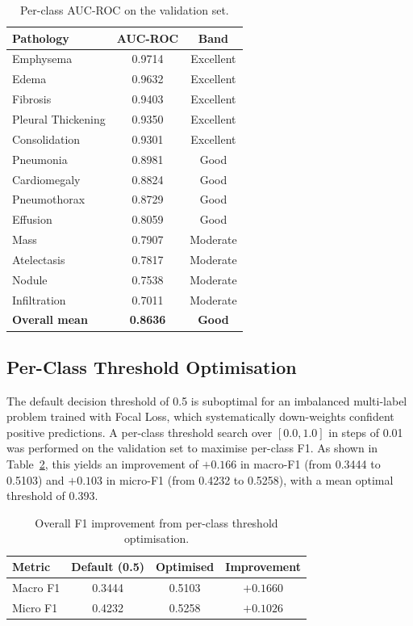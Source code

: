 \documentclass[preprint,12pt,authoryear]{elsarticle}
\begin{document}
\begin{table}[ht]
\centering
\caption{Per-class AUC-ROC on the validation set.}
\label{tab:per_class_auc}
\renewcommand{\arraystretch}{1.2}
\begin{tabular}{lcc}
\toprule
\textbf{Pathology} & \textbf{AUC-ROC} & \textbf{Band} \\
\midrule
Emphysema           & 0.9714 & Excellent \\
Edema               & 0.9632 & Excellent \\
Fibrosis            & 0.9403 & Excellent \\
Pleural Thickening  & 0.9350 & Excellent \\
Consolidation       & 0.9301 & Excellent \\
Pneumonia           & 0.8981 & Good \\
Cardiomegaly        & 0.8824 & Good \\
Pneumothorax        & 0.8729 & Good \\
Effusion            & 0.8059 & Good \\
Mass                & 0.7907 & Moderate \\
Atelectasis         & 0.7817 & Moderate \\
Nodule              & 0.7538 & Moderate \\
Infiltration        & 0.7011 & Moderate \\
\midrule
\textbf{Overall mean} & \textbf{0.8636} & \textbf{Good} \\
\bottomrule
\end{tabular}
\end{table}

\subsection{Per-Class Threshold Optimisation}
\label{sec:threshold}

The default decision threshold of 0.5 is suboptimal for an imbalanced multi-label problem trained with Focal Loss, which systematically down-weights confident positive predictions. A per-class threshold search over $[0.0, 1.0]$ in steps of 0.01 was performed on the validation set to maximise per-class F1. As shown in Table~\ref{tab:threshold_overall}, this yields an improvement of $+0.166$ in macro-F1 (from 0.3444 to 0.5103) and $+0.103$ in micro-F1 (from 0.4232 to 0.5258), with a mean optimal threshold of 0.393.

\begin{table}[ht]
\centering
\caption{Overall F1 improvement from per-class threshold optimisation.}
\label{tab:threshold_overall}
\renewcommand{\arraystretch}{1.2}
\begin{tabular}{lccc}
\toprule
\textbf{Metric} & \textbf{Default (0.5)} & \textbf{Optimised} & \textbf{Improvement} \\
\midrule
Macro F1 & 0.3444 & 0.5103 & $+0.1660$ \\
Micro F1 & 0.4232 & 0.5258 & $+0.1026$ \\
\bottomrule
\end{tabular}
\end{table}
\end{document}
